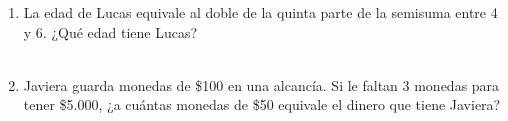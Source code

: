 \documentclass[11pt,letterpaper]{article}
\newenvironment{alternativas}{%
\begin{enumerate}[label=\Alph*), leftmargin=14pt, itemsep=2pt, topsep=2pt]
}{\end{enumerate}}
\begin{document}
\begin{enumerate}[label=\textbf{\arabic*.}, leftmargin=*, itemsep=7pt]
\item
\begin{minipage}[t]{\linewidth}
La edad de Lucas equivale al doble de la quinta parte de la semisuma entre 4 y 6. ¿Qué edad tiene Lucas?\\
\\%
\begin{minipage}{\linewidth}
\vspace{7mm}
\end{minipage}
\vspace{7mm}
\end{minipage}

\item
\begin{minipage}[t]{\linewidth}
Javiera guarda monedas de \$100 en una alcancía. Si le faltan 3 monedas para tener \$5.000, ¿a cuántas monedas de \$50 equivale el dinero que tiene Javiera?\\
\\%
\begin{minipage}{\linewidth}
\vspace{7mm}
\end{minipage}
\vspace{7mm}
\end{minipage}


\end{enumerate}
\end{document}
